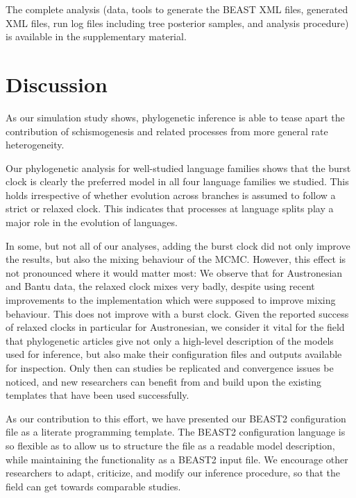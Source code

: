 \documentclass[]{rsos}%
\begin{document}
The complete analysis (data, tools to generate the BEAST XML files, generated XML files,
run log files including tree posterior samples, and analysis procedure) is
available in the supplementary material.

\section{Discussion}\label{s:discussion}

As our simulation study shows, phylogenetic inference is able to tease apart the
contribution of schismogenesis and related processes from more general rate
heterogeneity.

Our phylogenetic analysis for well-studied language families shows that the
burst clock is clearly the preferred model in all four language families we
studied. This holds irrespective of whether evolution across branches is assumed
to follow a strict or relaxed clock. This indicates that processes at language
splits play a major role in the evolution of languages.

In some, but not all of our analyses, adding the burst clock did not only
improve the results, but also the mixing behaviour of the MCMC. However, this
effect is not pronounced where it would matter most: We observe that for
Austronesian and Bantu data, the relaxed clock mixes very badly, despite using
recent improvements to the implementation which were supposed to improve mixing
behaviour. This does not improve with a burst clock. Given the reported success
of relaxed clocks in particular for Austronesian, we consider it vital for the
field that phylogenetic articles give not only a high-level description of the
models used for inference, but also make their configuration files and outputs
available for inspection.
Only then can studies be replicated and convergence issues be noticed, and
new researchers can benefit from and build upon the existing templates that
have been used successfully.

As our contribution to this effort, we have presented our BEAST2 configuration
file as a literate programming template. The BEAST2 configuration language is so
flexible as to allow us to structure the file as a readable model description,
while maintaining the functionality as a BEAST2 input file. We encourage other
researchers to adapt, criticize, and modify our inference procedure, so that the
field can get towards comparable studies.
\end{document}
